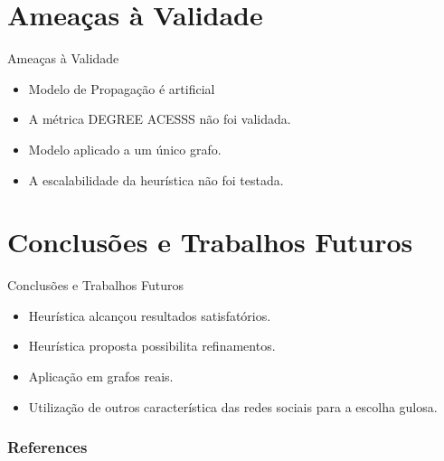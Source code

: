 \documentclass[t,14pt,mathserif,xcolor=table]{beamer}
\begin{document}
\section{Ameaças à Validade}

\begin{frame}{Ameaças à Validade}

	\begin{itemize}
		
		\item Modelo de Propagação é artificial
		\item A métrica \textsc{DEGREE ACESSS}{} não foi validada.
		\item Modelo aplicado a um único grafo.
		\item A escalabilidade da heurística não foi testada.		
	\end{itemize}	


\end{frame}




\section{Conclusões e Trabalhos Futuros}

\begin{frame}{Conclusões e Trabalhos Futuros}

	\begin{itemize}
		
		\item Heurística alcançou resultados satisfatórios.
		\item Heurística proposta possibilita refinamentos.
		\item Aplicação em grafos reais.
		\item Utilização de outros característica das redes sociais para a escolha gulosa.			
		
	\end{itemize}	


\end{frame}


\begin{frame}[allowframebreaks]
   \frametitle{References}
   
   
\end{frame}
\end{document}

